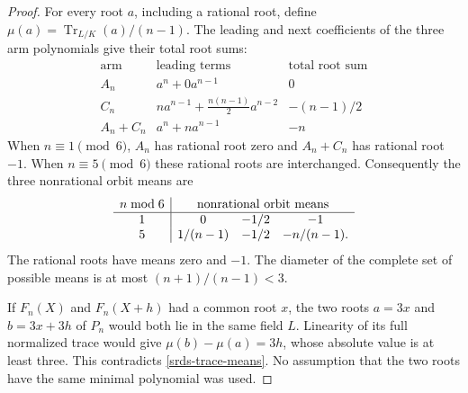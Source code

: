 \begin{proof}
For every root \(a\), including a rational root, define
\(\mu(a)=\operatorname{Tr}_{L/K}(a)/(n-1)\).
The leading and next coefficients of the three arm polynomials
give their total root sums:
\[
 \begin{array}{c|c|c}
 \text{arm}&\text{leading terms}&\text{total root sum}\\ \hline
 A_n&a^n+0a^{n-1}&0\\
 C_n&na^{n-1}+\frac{n(n-1)}2a^{n-2}&-(n-1)/2\\
 A_n+C_n&a^n+na^{n-1}&-n
 \end{array}
\]
When \(n\equiv1\pmod6\), \(A_n\) has rational root zero and
\(A_n+C_n\) has rational root \(-1\). When \(n\equiv5\pmod6\)
these rational roots are interchanged. Consequently the three
nonrational orbit means are
\begin{equation}
 \begin{array}{c|ccc}
 n\bmod6&\multicolumn{3}{c}{\text{nonrational orbit means}}\\ \hline
 1&0&-1/2&-1\\
 5&1/(n-1)&-1/2&-n/(n-1).
 \end{array}
 \label{srds-trace-means}
\end{equation}
The rational roots have means zero and \(-1\). The diameter of
the complete set of possible means is at most
\((n+1)/(n-1)<3\).

If \(F_n(X)\) and \(F_n(X+h)\) had a common root \(x\), the
two roots \(a=3x\) and \(b=3x+3h\) of \(P_n\) would both lie in
the same field \(L\). Linearity of its full normalized trace would
give \(\mu(b)-\mu(a)=3h\), whose absolute value is at least three.
This contradicts \eqref{srds-trace-means}. No assumption that the
two roots have the same minimal polynomial was used.
\end{proof}

